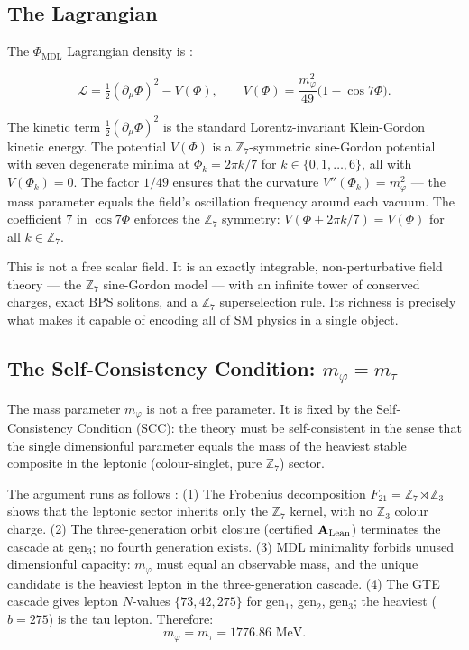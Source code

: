 \documentclass[11pt,openany]{book}
\theoremstyle{remark}
\newcommand{\PHIMDL}{\Phi_{\mathrm{MDL}}}
\newcommand{\ZS}{\mathbb{Z}_7}
\newcommand{\CatAL}{\ensuremath{\textbf{A}_{\rm Lean}}}
\begin{document}
\subsection*{The Lagrangian}

The $\PHIMDL$ Lagrangian density is \cite{SpivackPhiMDLField,SpivackCompleteness}:

\begin{equation}
\mathcal{L} = \tfrac{1}{2}(\partial_\mu\Phi)^2 - V(\Phi),
\qquad
V(\Phi) = \frac{m_\varphi^2}{49}\bigl(1 - \cos 7\Phi\bigr).
\label{eq:phimdl_lagrangian}
\end{equation}

The kinetic term $\tfrac{1}{2}(\partial_\mu\Phi)^2$ is the standard Lorentz-invariant
Klein-Gordon kinetic energy.
The potential $V(\Phi)$ is a $\ZS$-symmetric sine-Gordon potential with seven degenerate
minima at $\Phi_k = 2\pi k/7$ for $k\in\{0,1,\ldots,6\}$, all with $V(\Phi_k) = 0$.
The factor $1/49$ ensures that the curvature $V''(\Phi_k) = m_\varphi^2$ --- the mass
parameter equals the field's oscillation frequency around each vacuum.
The coefficient $7$ in $\cos 7\Phi$ enforces the $\ZS$ symmetry:
$V(\Phi + 2\pi k/7) = V(\Phi)$ for all $k\in\mathbb{Z}_7$.

This is not a free scalar field.
It is an exactly integrable, non-perturbative field theory --- the $\ZS$ sine-Gordon
model --- with an infinite tower of conserved charges, exact BPS solitons, and a
$\mathbb{Z}_7$ superselection rule.
Its richness is precisely what makes it capable of encoding all of SM physics
in a single object.



\subsection*{The Self-Consistency Condition: $m_\varphi = m_\tau$}

The mass parameter $m_\varphi$ is not a free parameter.
It is fixed by the Self-Consistency Condition (SCC): the theory must be self-consistent
in the sense that the single dimensionful parameter equals the mass of the heaviest
stable composite in the leptonic (colour-singlet, pure $\ZS$) sector.

The argument runs as follows \cite{SpivackPhiMDLField}:
(1) The Frobenius decomposition $F_{21} = \ZS\rtimes\mathbb{Z}_3$ shows that the
leptonic sector inherits only the $\ZS$ kernel, with no $\mathbb{Z}_3$ colour charge.
(2) The three-generation orbit closure (certified \CatAL) terminates the cascade at
gen$_3$; no fourth generation exists.
(3) MDL minimality forbids unused dimensionful capacity: $m_\varphi$ must equal an
observable mass, and the unique candidate is the heaviest lepton in the
three-generation cascade.
(4) The GTE cascade gives lepton $N$-values $\{73,42,275\}$ for gen$_1$, gen$_2$,
gen$_3$; the heaviest ($b=275$) is the tau lepton.
Therefore:
\[
m_\varphi = m_\tau = 1776.86\text{ MeV}.
\]
\end{document}
